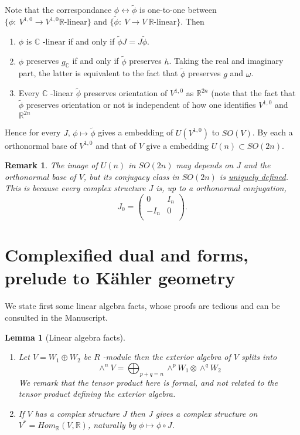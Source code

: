\documentclass[11pt]{article}
\newtheorem{remark}{Remark}
\newtheorem{lemma}[theorem]{Lemma}
\begin{document}
Note that the correspondance \(\phi \leftrightarrow \tilde\phi\) is one-to-one between \(\{\phi:\
V^{1,0}\longrightarrow V^{1,0} \mathbb{R}\text{-linear}\}\) and \(\{\tilde\phi:\ V\longrightarrow V\
\mathbb{R}\text{-linear}\}\). Then
\begin{enumerate}
\item \(\phi\) is \(\mathbb{C}\) -linear if and only if \(\tilde\phi J = J\tilde\phi\).
\item \(\phi\) preserves \(g_{\mathbb{C}}\) if and only if \(\tilde\phi\) preserves \(h\). Taking the real
and imaginary part, the latter is equivalent to the fact that \(\tilde\phi\) preserves \(g\) and
\(\omega\).
\item Every \(\mathbb{C}\) -linear \(\tilde \phi\) preserves orientation of \(V^{1,0}\) as \(\mathbb{R}^{2n}\)
(note that the fact that \(\tilde\phi\) preserves orientation or not is independent of how one
identifies \(V^{1,0}\) and \(\mathbb{R}^{2n}\)
\end{enumerate}
Hence for every \(J\), \(\phi\mapsto\tilde\phi\) gives a embedding of \(U(V^{1,0})\) to \(SO(V)\). By each
a orthonormal base of \(V^{1,0}\) and that of \(V\) give a embedding \(U(n)\subset SO(2n)\).

\begin{remark}
The image of \(U(n)\) in \(SO(2n)\) may depends on \(J\) and the orthonormal base of \(V\), but its
conjugacy class in \(SO(2n)\) is \uline{uniquely defined}. This is because every complex structure \(J\) is,
up to a orthonormal conjugation, 
\[
J_0 = \begin{pmatrix}
0 & I_n \\
-I_n & 0 \\
\end{pmatrix}.
\]
\end{remark}


\section*{Complexified dual and forms, prelude to Kähler geometry}
\label{sec:orgc0ba8e9}

We state first some linear algebra facts, whose proofs are tedious and can be consulted in the Manuscript.

\begin{lemma}[Linear algebra facts]
\label{lem:alg-exterior}
\label{org8e47306}
\begin{enumerate}
\item Let \(V = W_1 \oplus W_2\) be \(R\) -module then the exterior algebra of \(V\) splits into \[\wedge^nV
   = \bigoplus_{p+q = n}\wedge^p W_1 \otimes \wedge^q W_2 \] We remark that the tensor product here
is formal, and not related to the tensor product defining the exterior algebra.
\item If \(V\) has a complex structure \(J\) then \(J\) gives a complex structure on \(V^* =
   Hom_{\mathbb{R}}(V, \mathbb{R})\), naturally by \(\phi\mapsto \phi\circ J\).
\end{enumerate}
\end{lemma}
\end{document}
